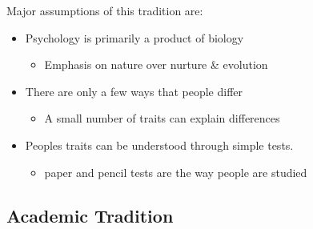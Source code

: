 \documentclass[12pt]{article}
\begin{document}
Major assumptions of this tradition are:
\begin{itemize}
    \item Psychology is primarily a product of biology
        \begin{itemize}
            \item Emphasis on nature over nurture \& evolution
        \end{itemize}
    \item There are only a few ways that people differ
        \begin{itemize}
            \item A small number of traits can explain differences
        \end{itemize}
    \item Peoples traits can be understood through simple tests.
        \begin{itemize}
            \item paper and pencil tests are the way people are studied
        \end{itemize}
\end{itemize}


\subsection*{Academic Tradition}
\end{document}
